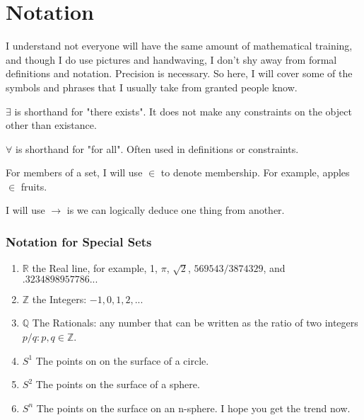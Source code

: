 \chapter{Notation}\label{ch:notation}
I understand not everyone will have the same amount of mathematical training, and though I do use pictures and handwaving, I don't shy away from formal definitions and notation.  Precision is necessary.  So here, I will cover some of the symbols and phrases that I usually take from granted people know.

\begin{definition}[Exists]
  $\exists$ is shorthand for "there exists".  It does not make any constraints on the object other than existance.
\end{definition}

\begin{definition}
  $\forall$ is shorthand for "for all".  Often used in definitions or constraints.
\end{definition}

\begin{definition}[In]
  For members of a set, I will use $\in$ to denote membership.  For example, apples $\in$ fruits.
\end{definition}

\begin{definition}[Implies]
  I will use $\rightarrow$ is we can logically deduce one thing from another.
\end{definition}

\subsection{Notation for Special Sets}
\begin{enumerate}
  \item $\mathbb{R}$ the Real line, for example, 1, $\pi$, $\sqrt{2}$, $569543/3874329$, and $.3234898957786...$
  \item $\mathbb{Z}$ the Integers: $-1, 0, 1, 2,...$
  \item $\mathbb{Q}$ The Rationals: any number that can be written as the ratio of two integers $p/q : p,q \in \mathbb{Z}$.
  \item $S^1$ The points on on the surface of a circle.
  \item $S^2$ The points on the surface of a sphere.
  \item $S^n$ The points on the surface on an n-sphere.  I hope you get the trend now.
\end{enumerate}
